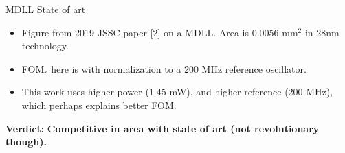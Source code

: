 \documentclass[t, screen, aspectratio=43]{beamer}
\begin{document}
\begin{frame}
\begin{block}{MDLL State of art}
	\begin{minipage}{6cm}
			\tiny	
			\begin{itemize}[itemsep=4pt,label=\protect---]
				\item Figure from 2019 JSSC paper [2] on a MDLL. Area is 0.0056 mm$^2$ in 28nm technology.
				\item FOM$_r$ here is with normalization to a 200 MHz reference oscillator.
				\item This work uses higher power (1.45 mW), and higher reference (200 MHz), which perhaps explains better FOM.
			\end{itemize} 	
	\end{minipage}
	\end{block}
	\scriptsize
	\vspace{-0.3em}
	{\color{red}\textbf{Verdict:}} \textbf{Competitive in area with state of art (not revolutionary though).}
\end{frame}
\end{document}
